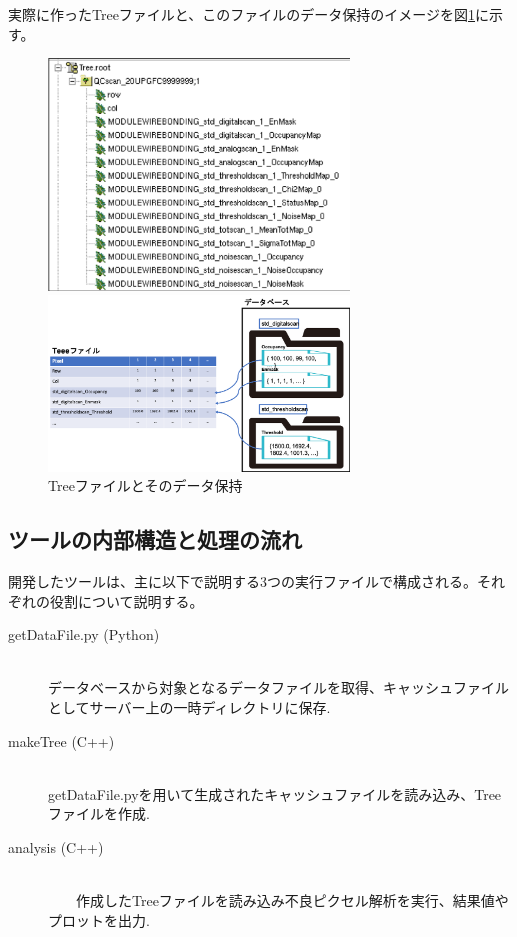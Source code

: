 実際に作ったTreeファイルと、このファイルのデータ保持のイメージを図\ref{analysis_tool_tree}に示す。

\begin{figure}[bpt]
  \begin{center}
  \begin{minipage}{0.4\hsize}
    \includegraphics[width=8cm]{analysis_tool_tree_file}
  \end{minipage}
  \begin{minipage}{0.4\hsize}
    \includegraphics[width=8cm]{analysis_tool_tree_image}
  \end{minipage}
  \caption[Treeファイルとそのデータ保持]{Treeファイルとそのデータ保持}
  \label{analysis_tool_tree}
  \end{center}
\end{figure}

\subsection{ツールの内部構造と処理の流れ}
開発したツールは、主に以下で説明する3つの実行ファイルで構成される。それぞれの役割について説明する。

\begin{description}
  \item[getDataFile.py (Python)]\mbox{}\\ 
    データベースから対象となるデータファイルを取得、キャッシュファイルとしてサーバー上の一時ディレクトリに保存.
  \item[makeTree (C++)]\mbox{}\\ 
    getDataFile.pyを用いて生成されたキャッシュファイルを読み込み、Treeファイルを作成.
  \item[analysis (C++)]\mbox{}\\ 
　　作成したTreeファイルを読み込み不良ピクセル解析を実行、結果値やプロットを出力.
\end{description}

